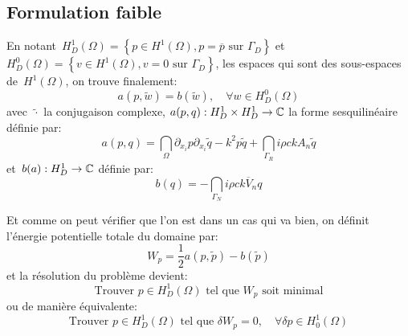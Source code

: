 \medskip
\subsection{Formulation faible}
En notant~$H^1_D(\Omega)=\left\{p\in H^1(\Omega), p=\overline{p} \text{ sur } \Gamma_D\right\}$ et $H^0_D(\Omega)=\left\{v\in H^1(\Omega), v=0 \text{ sur } \Gamma_D\right\}$, les espaces qui sont des sous-espaces de~$H^1(\Omega)$, on trouve finalement:
\begin{equation}
a(p,\tilde{w})=b(\tilde{w}), \quad \forall w\in H^0_D(\Omega)
\end{equation}
avec~$\tilde{\cdot}$ la conjugaison complexe, $a(p,q): H^1_D\times H^1_D \rightarrow \mathbb C$ la forme sesquilinéaire définie par:
\begin{equation}\label{Eq-Helmacomplex}
a(p,q)=\dint_\Omega \partial_{x_i}p\partial_{x_i}\tilde{q}-k^2p\tilde{q} +
\dint_{\Gamma_R} i\rho ckA_n\tilde{q}
\end{equation}
et~$b(a): H^1_D\rightarrow\mathbb C$ définie par:
\begin{equation}\label{Eq-Helmbcomplex}
b(q)=-\dint_{\Gamma_N} i\rho c k\overline{V}_n q
\end{equation}

\medskip
Et comme on peut vérifier que l'on est dans un cas qui va bien, on définit l'énergie potentielle totale du domaine par:
\begin{equation}
W_p=\frac12 a(p,\tilde{p})-b(\tilde{p})
\end{equation}
et la résolution du problème devient:
\begin{equation}
\text{Trouver } p\in H^1_D(\Omega) \text{ tel que } W_p \text{ soit minimal}
\end{equation}
ou de manière équivalente:
\begin{equation}
\text{Trouver } p\in H^1_D(\Omega) \text{ tel que } \delta W_p=0,\quad \forall\delta p\in H^1_0(\Omega)
\end{equation} 

\medskip
{}

